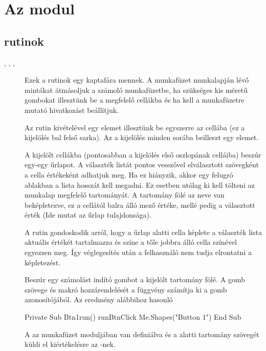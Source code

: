 \section{Az  modul}\label{sec:6.2}

\subsection{ rutinok}

\begin{description}
\item[, ,
  , ] Ezek a rutinok egy
  kaptafára mennek. A  
  munkafüzet  munkalapján lévő mintákat  átmásoljuk a számoló
  munkafüzetbe, ha szükséges kis méretű gombokat illesztünk be  a
  megfelelő cellákba és ha kell a  munkafüzetre mutató
  hivatkozást beállítjuk.  

  Az  rutin kivételével egy
  elemet illesztünk be egyszerre az  cellába (ez a kijelölés
  bal felső sarka). Az  a kijelölés minden sorába 
  beilleszt egy  elemet.
\item[] A kijelölt cellákba
  (pontosabban a kijelölés első oszlopának celláiba) beszúr  egy-egy
   űrlapot. A választék listát pontos vesszővel elválasztott
  szövegként  a cella értékeként adhatjuk meg. Ha ez hiányzik,
  akkor egy felugró ablakban a lista hosszát kell megadni. Ez esetben
  utólag ki kell tölteni az  munkalap megfelelő tartományát. A
  tartomány fölé az  neve van beképletezve, ez a cellától balra
  álló mező értéke, mellé pedig a választott érték (Ide mutat az
  űrlap  tulajdonsága).  

  A rutin gondoskodik arról, hogy a
   űrlap alatti cella képlete a választék lista  aktuális
  értékét tartalmazza és színe a tőle jobbra álló cella színével
  egyezzen meg. Így  véglegesítés után a felhasználó nem tudja
  elrontatni a képletezést.
\item[] Beszúr egy
  számolást indító gombot a kijelölt tartomány fölé. A gomb szövege
   és makró hozzárendelését a  függvény
  számítja ki a gomb azonosítójából. Az eredmény alábbihoz hasonló
\begin{VBAframe}
Private Sub Btn1run() 
  runBtnClick Me.Shapes("Button 1") 
End Sub
\end{VBAframe}
 A
   az  munkafüzet 
  moduljában van definiálva 
  és a  alatti tartomány szövegét küldi el kiértékelésre az
  -nek.  


\end{description}
